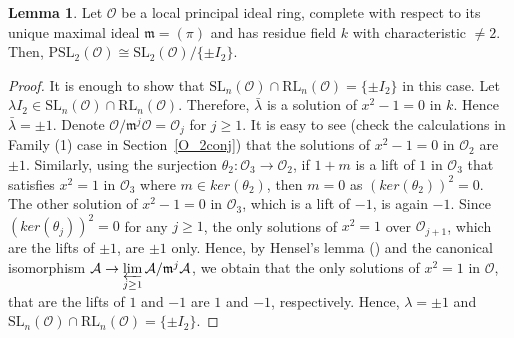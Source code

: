 \documentclass[10pt,twoside]{amsart}
\newcommand{\SL}{\mathrm{SL}}
\theoremstyle{definition}
\theoremstyle{definition}
\newtheorem{lemma}[theorem]{Lemma}
\begin{document}
\begin{lemma}{\label{psl}}
Let $\mathcal{O}$ be a local principal ideal ring, complete with respect to its unique maximal ideal $\mathfrak{m}=(\pi)$ and has residue field $k$ with characteristic $\neq 2$. Then,  $\mathrm{PSL}_2(\mathcal{O}) \cong \SL_2(\mathcal{O})/\{\pm I_2\}$.
\end{lemma}
\begin{proof}
It is enough to show that $\SL_n(\mathcal{O}) \cap \mathrm{RL}_n(\mathcal{O}) = \{\pm I_2\}$ in this case. Let $\lambda I_2 \in \SL_n(\mathcal{O}) \cap \mathrm{RL}_n(\mathcal{O})$. Therefore, $\bar \lambda$ is a solution of $x^2-1 = 0$ in $k$. Hence $\bar \lambda = \pm 1$. Denote $\mathcal{O}/ \mathfrak{m}^j\mathcal{O} =\mathcal{O}_j$ for $j\geq 1$. It is easy to see (check the calculations in Family (1) case in Section~\ref{O_2conj}) that the solutions of $x^2 - 1 = 0$ in $\mathcal{O}_2$ are $\pm 1$. Similarly, using the surjection $\theta_2 \colon \mathcal{O}_3 \rightarrow \mathcal{O}_2$, if $1 + m$ is a lift of $1$ in $\mathcal{O}_3$ that satisfies $x^2=1$ in $\mathcal{O}_3$ where $m\in ker(\theta_2)$, then $m=0$ as $(ker (\theta_2))^2=0$. The other solution of $x^2-1=0$ in $\mathcal{O}_3$, which is a lift of $-1$, is again $-1$. Since $(ker (\theta_j))^2 = 0$ for any $j\geq 1$, the only solutions of $x^2=1$ over $\mathcal{O}_{j+1}$, which are the lifts of $\pm 1$, are $\pm 1$ only. Hence, by Hensel's lemma (\cite[theorem 7.18]{EisenbudCommAlgebra}) and the canonical isomorphism $\mathcal{A}\rightarrow \varprojlim\limits_{j\geq 1} \mathcal{A}/\mathfrak{m}^j\mathcal{A}$, we obtain that the only solutions of $x^2 = 1$ in $\mathcal{O}$, that are the lifts of $1$ and $-1$ are $1$ and $-1$, respectively. Hence, $\lambda = \pm 1$ and $\SL_n(\mathcal{O}) \cap \mathrm{RL}_n(\mathcal{O}) = \{\pm I_2\}$. 
\end{proof}
\end{document}
